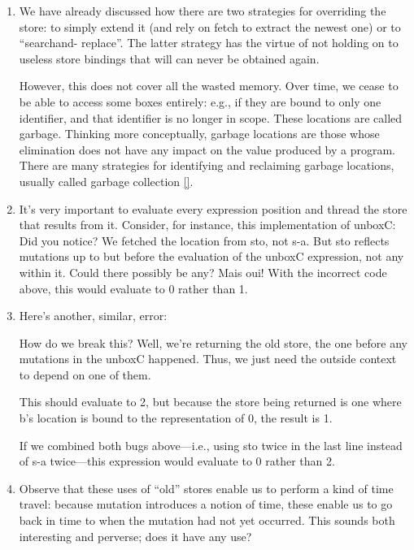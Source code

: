 \begin{enumerate}
  \item
We have already discussed how there are two strategies for overriding the store:
to simply extend it (and rely on fetch to extract the newest one) or to
“searchand- replace”. The latter strategy has the virtue of not holding on to
useless store bindings that will can never be obtained again.

However, this does not cover all the wasted memory. Over time, we cease to be
able to access some boxes entirely: e.g., if they are bound to only one
identifier, and that identifier is no longer in scope. These locations are
called garbage. Thinking more conceptually, garbage locations are those whose
elimination does not have any impact on the value produced by a program. There
are many strategies for identifying and reclaiming garbage locations, usually
called garbage collection \ref{}.
  
  \item
It’s very important to evaluate every expression position and thread the store
that results from it. Consider, for instance, this implementation of unboxC:
Did you notice? We fetched the location from sto, not s-a. But sto reflects
mutations up to but before the evaluation of the unboxC expression, not any
within it. Could there possibly be any? Mais oui!
With the incorrect code above, this would evaluate to 0 rather than 1.

  \item
Here’s another, similar, error:

How do we break this? Well, we’re returning the old store, the one before any
mutations in the unboxC happened. Thus, we just need the outside context to
depend on one of them.

This should evaluate to 2, but because the store being returned is one where b’s
location is bound to the representation of 0, the result is 1.

If we combined both bugs above—i.e., using sto twice in the last line instead of
s-a twice—this expression would evaluate to 0 rather than 2.


  \item
Observe that these uses of “old” stores enable us to perform a kind of time
travel: because mutation introduces a notion of time, these enable us to go back
in time to when the mutation had not yet occurred. This sounds both interesting
and perverse; does it have any use?


\end{enumerate}
